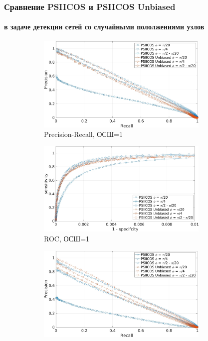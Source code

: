 \documentclass[12pt]{beamer}
\begin{document}
\begin{frame}[t]
    \frametitle{Сравнение PSIICOS и PSIICOS Unbiased}
    \framesubtitle{в задаче детекции сетей со случайными пололжениями узлов}
    \begin{figure}[htbp]
        \begin{subfigure}[t]{0.49\textwidth}
            \centering
            \includegraphics[width=0.9\textwidth]{../images/pre_rec_snr_1.jpg}
            {\tiny Precision-Recall, ОСШ=1}
        \end{subfigure}
        \begin{subfigure}[t]{0.49\textwidth}
            \centering
            \includegraphics[width=0.9\textwidth]{../images/roc_snr_1.jpg}
            {\tiny ROC, ОСШ=1}
        \end{subfigure}
        \begin{subfigure}[t]{0.49\textwidth}
            \centering
            \includegraphics[width=0.9\textwidth]{../images/pre_rec_snr_02.jpg}

\end{subfigure}
\end{figure}
\end{frame}
\end{document}
